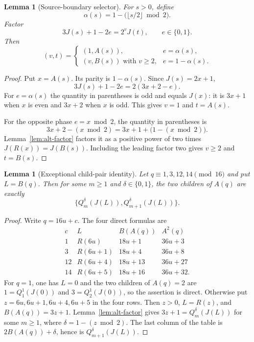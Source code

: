 \documentclass[11pt,a4paper]{article}
\newtheorem{lemma}[theorem]{Lemma}
\theoremstyle{definition}
\theoremstyle{remark}
\begin{document}
\begin{lemma}[Source-boundary selector]\label{lem:source-selector}
For $s>0$, define
\[
 \alpha(s)=1-\bigl(\lfloor s/2\rfloor\bmod2\bigr).
\]
Factor
\[
 3J(s)+1-2e=2^v J(t),\qquad e\in\{0,1\}.
\]
Then
\[
 (v,t)=
 \begin{cases}
  (1,A(s)),&e=\alpha(s),\\
  (v,B(s))\text{ with }v\ge2,&e=1-\alpha(s).
 \end{cases}
\]
\end{lemma}

\begin{proof}
Put $x=A(s)$.  Its parity is $1-\alpha(s)$.  Since $J(s)=2x+1$,
\[
 3J(s)+1-2e=2(3x+2-e).
\]
For $e=\alpha(s)$ the quantity in parentheses is odd and equals $J(x)$:
it is $3x+1$ when $x$ is even and $3x+2$ when $x$ is odd.  This gives
$v=1$ and $t=A(s)$.

For the opposite phase $e=x\bmod2$, the quantity in parentheses is
\[
 3x+2-(x\bmod2)=3x+1+\bigl(1-(x\bmod2)\bigr).
\]
Lemma~\ref{lem:alt-factor} factors it as a positive power of two times
$J(R(x))=J(B(s))$.  Including the leading factor two gives $v\ge2$ and
$t=B(s)$.
\end{proof}

\begin{lemma}[Exceptional child-pair identity]\label{lem:exceptional-pair}
Let $q\equiv1,3,12,14\pmod {16}$ and put $L=B(q)$.  Then for some
$m\ge1$ and $\delta\in\{0,1\}$, the two children of $A(q)$ are exactly
\[
 \{Q_m^\delta(J(L)),Q_{m+1}^\delta(J(L))\}.
\]
\end{lemma}

\begin{proof}
Write $q=16u+c$.  The four direct formulas are
\[
\begin{array}{c|c|c|c}
 c&L&B(A(q))&A^2(q)\\ \hline
 1&R(6u)&18u+1&36u+3\\
 3&R(6u+1)&18u+4&36u+8\\
 12&R(6u+4)&18u+13&36u+27\\
 14&R(6u+5)&18u+16&36u+32.
\end{array}
\]
For $q=1$, one has $L=0$ and the two children of $A(q)=2$ are
$1=Q_1^1(J(0))$ and $3=Q_2^1(J(0))$, so the assertion is direct.
Otherwise put $z=6u,6u+1,6u+4,6u+5$ in the four rows.  Then $z>0$,
$L=R(z)$, and $B(A(q))=3z+1$.  Lemma~\ref{lem:alt-factor} gives
$3z+1=Q_m^\delta(J(L))$ for some $m\ge1$, where
$\delta=1-(z\bmod2)$.  The last column of the table is
$2B(A(q))+\delta$, hence is $Q_{m+1}^\delta(J(L))$.
\end{proof}
\end{document}
